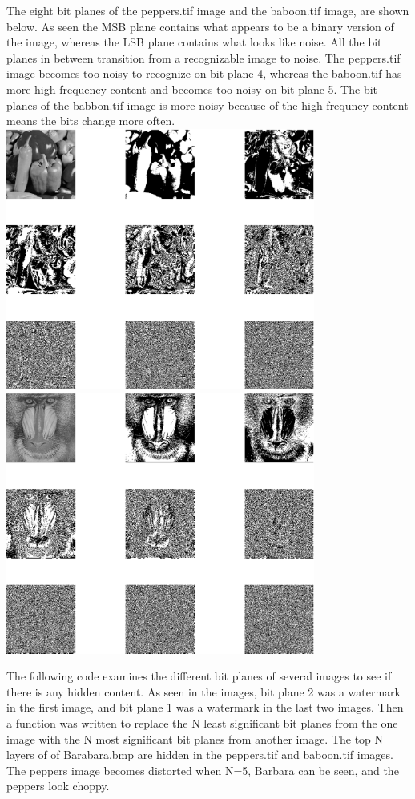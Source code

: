\documentclass{article}
\begin{document}
The eight bit planes of the peppers.tif image and the baboon.tif image, are
shown below. As seen the MSB plane contains what appears to be a binary
version of the image, whereas the LSB plane contains what looks like noise.
All the bit planes in between transition from a recognizable image to noise.
The peppers.tif image becomes too noisy to recognize on bit plane 4,
whereas the baboon.tif has more high frequency content and becomes too
noisy on bit plane 5. The bit planes of the babbon.tif image is more noisy
because of the high frequncy content means the bits change more often. 
\includegraphics [width=4in]{lab3_01.eps}
\includegraphics [width=4in]{lab3_02.eps}

The following code examines the different bit planes of several images to
see if there is any hidden content. As seen in the images, bit plane 2 was a
watermark in the first image, and bit plane 1 was a watermark in the last
two images. Then a function was written to replace the N least significant
bit planes from the one image with the N most significant bit planes from
another image. The top N layers of of Barabara.bmp are hidden in the
peppers.tif and baboon.tif images. The peppers image becomes distorted when
N=5, Barbara can be seen, and the peppers look choppy. 
\end{document}
